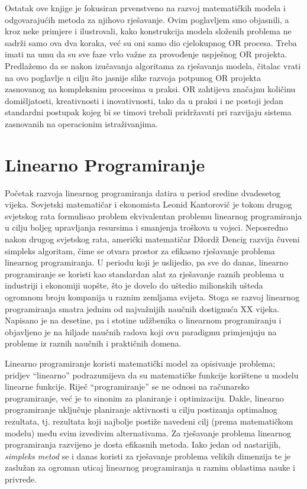 \documentclass[a4paper, utf8, 11pt, colorlinks]{book}
\begin{document}
Ostatak ove knjige je fokusiran prvenstveno na razvoj matematičkih modela i odgovarajućih metoda za njihovo rješavanje. Ovim poglavljem smo objasnili, a kroz neke primjere i ilustrovali, kako konstrukcija modela složenih problema ne sadrži samo ova dva koraka, već su oni samo dio cjelokupnog OR procesa. Treba imati na umu da su sve faze vrlo važne za provođenje uspješnog OR projekta. Predlažemo da se nakon izučavanja algoritama za rješavanja modela, čitalac vrati na ovo poglavlje u cilju što jasnije slike razvoja potpunog OR projekta zasnovanog na kompleksnim procesima u praksi.  OR zahtijeva značajnu količinu domišljatosti, kreativnosti i inovativnosti, tako da u praksi i ne postoji jedan standardni postupak kojeg bi se timovi trebali pridržavati pri razvijaju sistema zasnovanih na operacionim istraživanjima. %

\chapter{Linearno Programiranje} 
  
  Početak razvoja linearnog programiranja datira u period sredine dvadesetog vijeka. Sovjetski matematičar i ekonomista Leonid Kantorovič je tokom drugog svjetskog rata formulisao problem ekvivalentan problemu linearnog programiranja u cilju boljeg upravljanja resursima i smanjenja troškova u vojsci. Neposredno nakon drugog svjetskog rata, američki matematičar Džordž Dencig razvija čuveni simpleks algoritam, čime se otvara prostor za efikasno rješavanje problema linearnog programiranja. U periodu koji je uslijedio, pa sve do danas, linearno programiranje se koristi kao standardan alat za rješavanje raznih problema u industriji i ekonomiji uopšte, što je dovelo do uštedio milionskih ušteda ogromnom broju kompanija u raznim zemljama svijeta. Stoga se 
razvoj linearnog programiranja  smatra jednim od najvažnijih naučnih dostignu\-ća XX vijeka.  Napisano je na desetine, pa i stotine udžbenika
o linearnom programiranju i objavljeno je na hiljade naučnih radova koji   ovu paradigmu primjenjuju na probleme iz raznih naučnih i praktičnih domena. 

Linearno programiranje koristi matematički model za opisivanje problema; 
pridjev ``linearno'' podrazumijeva da su  matematičke funkcije korištene u modelu linearne funkcije. Riječ ``programiranje'' se ne odnosi na računarsko programiranje, već je to sinonim za planiranje i optimizaciju. Dakle, linearno programiranje uključuje planiranje aktivnosti u cilju postizanja optimalnog rezultata, tj. rezultata koji najbolje postiže navedeni cilj (prema matematičkom modelu) među svim izvedivim alternativama.  Za rješavanje problema linearnog programiranja razvijeno je dosta efikasnih metoda. Iako jedan od nastarijih,  \emph{simpleks metod} se i danas koristi za rješavanje problema velikih dimenzija te je zaslužan za ogroman uticaj linearnog  programiranja u raznim oblastima nauke i privrede.
\end{document}

